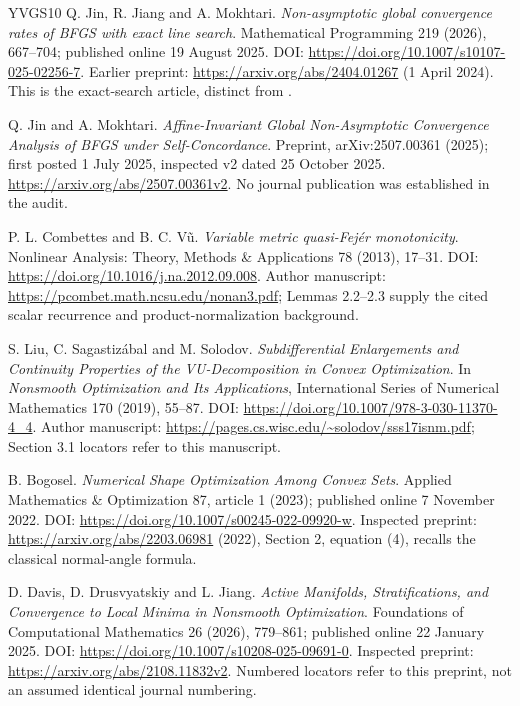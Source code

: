 \begin{thebibliography}{YVGS10}
 Q. Jin, R. Jiang and A. Mokhtari. \emph{Non-asymptotic global convergence rates of BFGS with exact line search}. Mathematical Programming 219 (2026), 667--704; published online 19 August 2025. DOI: \url{https://doi.org/10.1007/s10107-025-02256-7}. Earlier preprint: \url{https://arxiv.org/abs/2404.01267} (1 April 2024). This is the exact-search article, distinct from \cite{FND_JJM24AW}.

 Q. Jin and A. Mokhtari. \emph{Affine-Invariant Global Non-Asymptotic Convergence Analysis of BFGS under Self-Concordance}. Preprint, arXiv:2507.00361 (2025); first posted 1 July 2025, inspected v2 dated 25 October 2025. \url{https://arxiv.org/abs/2507.00361v2}. No journal publication was established in the audit.

 P. L. Combettes and B. C. V\~u. \emph{Variable metric quasi-Fej\'er monotonicity}. Nonlinear Analysis: Theory, Methods \& Applications 78 (2013), 17--31. DOI: \url{https://doi.org/10.1016/j.na.2012.09.008}. Author manuscript: \url{https://pcombet.math.ncsu.edu/nonan3.pdf}; Lemmas 2.2--2.3 supply the cited scalar recurrence and product-normalization background.

 S. Liu, C. Sagastiz\'abal and M. Solodov. \emph{Subdifferential Enlargements and Continuity Properties of the VU-Decomposition in Convex Optimization}. In \emph{Nonsmooth Optimization and Its Applications}, International Series of Numerical Mathematics 170 (2019), 55--87. DOI: \url{https://doi.org/10.1007/978-3-030-11370-4_4}. Author manuscript: \url{https://pages.cs.wisc.edu/~solodov/sss17isnm.pdf}; Section 3.1 locators refer to this manuscript.

 B. Bogosel. \emph{Numerical Shape Optimization Among Convex Sets}. Applied Mathematics \& Optimization 87, article 1 (2023); published online 7 November 2022. DOI: \url{https://doi.org/10.1007/s00245-022-09920-w}. Inspected preprint: \url{https://arxiv.org/abs/2203.06981} (2022), Section 2, equation (4), recalls the classical normal-angle formula.

 D. Davis, D. Drusvyatskiy and L. Jiang. \emph{Active Manifolds, Stratifications, and Convergence to Local Minima in Nonsmooth Optimization}. Foundations of Computational Mathematics 26 (2026), 779--861; published online 22 January 2025. DOI: \url{https://doi.org/10.1007/s10208-025-09691-0}. Inspected preprint: \url{https://arxiv.org/abs/2108.11832v2}. Numbered locators refer to this preprint, not an assumed identical journal numbering.


\end{thebibliography}
